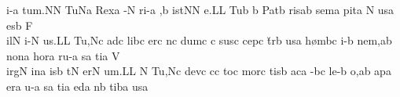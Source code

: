 \sgn {}i-\punctum a\egn
\sgn tu{m.}\punctum N\augmentum N\egn
\spatium
\divisiofinalis
\spatium
\sgn Tu{}\pes Na\egn
\spatium
\sgn Rex\punctum a\egn
\spatium
{}-\punctum N\egn
\sgn ri-\punctum a\egn
\sgn {}{\ae},\engl{}\punctum b\egn
\spatium
{}i{st}\punctum N\augmentum N\egn
\sgn {}e.\punctum L\augmentum L\egn
\spatium
\divisiofinalis
\spatium
\sgn Tu{}\punctum b\egn
\spatium
\custos b
\lineaproxima
\sgn Pat\punctum b\egn
\sgn ris\punctum a\augmentum b\egn
\spatium
\divisiominima
\spatium
\sgn sem\punctum a\egn
\sgn pit\punctum a\egn
{}\punctum N\egn
{}us\punctum a\egn
\spatium
\sgn {}es\engl{}\punctum b\egn
\spatium
\sgn F{\\i}l\punctum N\egn
\sgn {}i-\punctum N\egn
\sgn {}u{s.}\punctum L\augmentum L\egn
\spatium
\divisiofinalis
\spatium
\sgn Tu{,}\pes Nc\egn
\spatium
\sgn {}ad\punctum c\egn
\spatium
\sgn lib\punctum c\egn
\sgn {}er\punctum c\egn
\sgn {}{\a}n\punctum c\egn
\sgn dum\punctum c\egn
\spatium
\custos c
\lineaproxima
\sgn sus\punctum c\egn
\sgn cep\punctum c\egn
\sgn t{\u}r\punctum b\egn
\sgn {}us\punctum a\egn
\spatium
\sgn h{\o}m\pes bc\egn
\sgn {}i-\punctum b\egn
\sgn ne{m,}\punctum a\augmentum b\egn
\spatium\divisiominima\spatium
%
\sgn non\punctum a\egn
\spatium\sgn hor\punctum a\egn
\sgn ru-\punctum a\egn
\sgn {}{\\i}s\punctum a\egn
\sgn ti{}\punctum a\egn
\spatium
\sgn V{\\i}{rg}\punctum N\egn
\sgn {}in\punctum a\egn
\sgn {}is\punctum b\egn
\spatium\sgn {}{\u}t\punctum N\egn
\sgn {}er\punctum N\egn
\sgn {}u{m.}\punctum L\augmentum L\egn
\spatium
\divisiofinalis
\spatium
\custos N
\lineaproxima
\sgn Tu{,}\pes Nc\egn
\spatium
\sgn dev\punctum c\egn
\sgn {}{\\i}c\engl{}\punctum c\egn
\sgn to{}\punctum c\egn
\spatium
\sgn mor\punctum c\egn
\sgn tis\punctum b\egn
\spatium
\sgn {}ac\punctum a\egn
\sgn {}{\u}-\pes bc\egn
%
\sgn le-\punctum b\egn
\sgn {}o,\punctum a\augmentum b\egn
\spatium
\divisiominor
\spatium
\sgn {}ap\punctum a\egn
\sgn {}er\punctum a\egn
\sgn {}u-\punctum a\egn
\sgn {}{\\i}s\punctum a\egn
\sgn ti{}\punctum a\egn
\spatium
{}ed\punctum a\egn
\sgn {}{\e}n\punctum b\egn
\sgn tib\punctum a\egn
\sgn {}us\punctum a\egn
